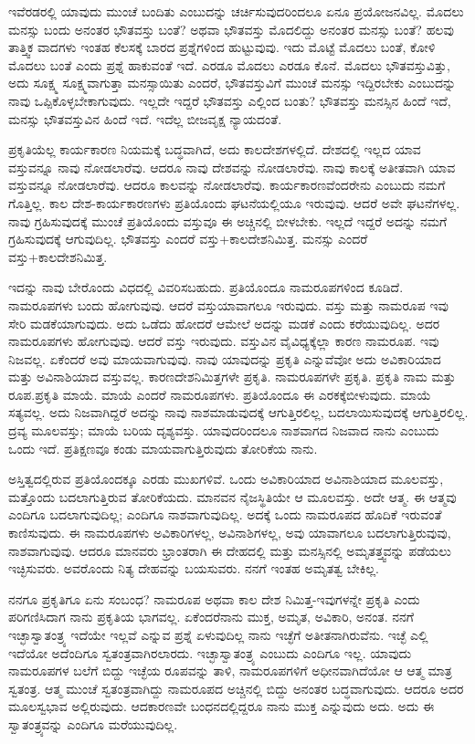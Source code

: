 ಇವೆರಡರಲ್ಲಿ ಯಾವುದು ಮುಂಚೆ ಬಂದಿತು ಎಂಬುದನ್ನು ಚರ್ಚಿಸುವುದರಿಂದಲೂ ಏನೂ ಪ್ರಯೋಜನವಿಲ್ಲ. ಮೊದಲು ಮನಸ್ಸು ಬಂದು ಅನಂತರ ಭೌತವಸ್ತು ಬಂತೆ? ಅಥವಾ ಭೌತವಸ್ತು ಮೊದಲಿದ್ದು ಅನಂತರ ಮನಸ್ಸು ಬಂತೆ? ಹಲವು ತಾತ್ತ್ವಿಕ ವಾದಗಳು ಇಂತಹ ಕೆಲಸಕ್ಕೆ ಬಾರದ ಪ್ರಶ್ನೆಗಳಿಂದ ಹುಟ್ಟುವುವು. ಇದು ಮೊಟ್ಟೆ ಮೊದಲು ಬಂತೆ, ಕೋಳಿ ಮೊದಲು ಬಂತೆ ಎಂದು ಪ್ರಶ್ನೆ ಹಾಕುವಂತೆ ಇದೆ. ಎರಡೂ ಮೊದಲು ಎರಡೂ ಕೊನೆ. ಮೊದಲು ಭೌತವಸ್ತುವಿತ್ತು, ಅದು ಸೂಕ್ಷ್ಮ ಸೂಕ್ಷ್ಮವಾಗುತ್ತಾ ಮನಸ್ಸಾಯಿತು ಎಂದರೆ, ಭೌತವಸ್ತುವಿಗೆ ಮುಂಚೆ ಮನಸ್ಸು ಇದ್ದಿರಬೇಕು ಎಂಬುದನ್ನು ನಾವು ಒಪ್ಪಿಕೊಳ್ಳಬೇಕಾಗುವುದು. ಇಲ್ಲದೇ ಇದ್ದರೆ ಭೌತವಸ್ತು ಎಲ್ಲಿಂದ ಬಂತು? ಭೌತವಸ್ತು ಮನಸ್ಸಿನ ಹಿಂದೆ ಇದೆ, ಮನಸ್ಸು ಭೌತವಸ್ತುವಿನ ಹಿಂದೆ ಇದೆ. ಇದೆಲ್ಲ ಬೀಜವೃಕ್ಷ ನ್ಯಾಯದಂತೆ.

ಪ್ರಕೃತಿಯೆಲ್ಲ ಕಾರ್ಯಕಾರಣ ನಿಯಮಕ್ಕೆ ಬದ್ಧವಾಗಿದೆ, ಅದು ಕಾಲದೇಶಗಳಲ್ಲಿದೆ. ದೇಶದಲ್ಲಿ ಇಲ್ಲದ ಯಾವ ವಸ್ತುವನ್ನೂ ನಾವು ನೋಡಲಾರೆವು. ಆದರೂ ನಾವು ದೇಶವನ್ನು ನೋಡಲಾರೆವು. ನಾವು ಕಾಲಕ್ಕೆ ಅತೀತವಾಗಿ ಯಾವ ವಸ್ತುವನ್ನೂ ನೋಡಲಾರೆವು. ಆದರೂ ಕಾಲವನ್ನು ನೋಡಲಾರೆವು. ಕಾರ್ಯಕಾರಣವೆಂದರೇನು ಎಂಬುದು ನಮಗೆ ಗೊತ್ತಿಲ್ಲ. ಕಾಲ ದೇಶ-ಕಾರ್ಯಕಾರಣಗಳು ಪ್ರತಿಯೊಂದು ಘಟನೆಯಲ್ಲಿಯೂ ಇರುವುವು. ಆದರೆ ಅವೇ ಘಟನೆಗಳಲ್ಲ. ನಾವು ಗ್ರಹಿಸುವುದಕ್ಕೆ ಮುಂಚೆ ಪ್ರತಿಯೊಂದು ವಸ್ತುವೂ ಈ ಅಚ್ಚಿನಲ್ಲಿ ಬೀಳಬೇಕು. ಇಲ್ಲದೆ ಇದ್ದರೆ ಅದನ್ನು ನಮಗೆ ಗ್ರಹಿಸುವುದಕ್ಕೆ ಆಗುವುದಿಲ್ಲ. ಭೌತವಸ್ತು ಎಂದರೆ ವಸ್ತು+ಕಾಲದೇಶನಿಮಿತ್ತ. ಮನಸ್ಸು ಎಂದರೆ ವಸ್ತು+ಕಾಲದೇಶನಿಮಿತ್ತ.

ಇದನ್ನು ನಾವು ಬೇರೊಂದು ವಿಧದಲ್ಲಿ ವಿವರಿಸಬಹುದು. ಪ್ರತಿಯೊಂದೂ ನಾಮರೂಪಗಳಿಂದ ಕೂಡಿದೆ. ನಾಮರೂಪಗಳು ಬಂದು ಹೋಗುವುವು. ಆದರೆ ವಸ್ತು\break ಯಾವಾಗಲೂ ಇರುವುದು. ವಸ್ತು ಮತ್ತು ನಾಮರೂಪ ಇವು ಸೇರಿ ಮಡಕೆಯಾಗುವುದು. ಅದು ಒಡೆದು ಹೋದರೆ ಆಮೇಲೆ ಅದನ್ನು ಮಡಕೆ ಎಂದು ಕರೆಯುವುದಿಲ್ಲ. ಅದರ ನಾಮರೂಪಗಳು ಹೋಗುವುವು. ಆದರೆ ವಸ್ತು ಇರುವುದು. ವಸ್ತುವಿನ ವೈವಿಧ್ಯಕ್ಕೆಲ್ಲಾ ಕಾರಣ ನಾಮರೂಪ. ಇವು ನಿಜವಲ್ಲ. ಏಕೆಂದರೆ ಅವು ಮಾಯವಾಗುವುವು. ನಾವು ಯಾವುದನ್ನು ಪ್ರಕೃತಿ ಎನ್ನುವೆವೋ ಅದು ಅವಿಕಾರಿಯಾದ ಮತ್ತು ಅವಿನಾಶಿಯಾದ ವಸ್ತುವಲ್ಲ. ಕಾರಣದೇಶನಿಮಿತ್ತಗಳೇ ಪ್ರಕೃತಿ. ನಾಮರೂಪಗಳೇ ಪ್ರಕೃತಿ. ಪ್ರಕೃತಿ ನಾಮ ಮತ್ತು ರೂಪ.\break ಪ್ರಕೃತಿ ಮಾಯೆ. ಮಾಯೆ ಎಂದರೆ ನಾಮರೂಪಗಳು. ಪ್ರತಿಯೊಂದೂ ಈ ಎರಕಕ್ಕೆ\break ಬೀಳುವುದು. ಮಾಯೆ ಸತ್ಯವಲ್ಲ. ಅದು ನಿಜವಾಗಿದ್ದರೆ ಅದನ್ನು ನಾವು ನಾಶಮಾಡುವುದಕ್ಕೆ ಆಗುತ್ತಿರಲಿಲ್ಲ, ಬದಲಾಯಿಸುವುದಕ್ಕೆ ಆಗುತ್ತಿರಲಿಲ್ಲ. ದ್ರವ್ಯ ಮೂಲವಸ್ತು; ಮಾಯೆ ಬರಿಯ ದೃಶ್ಯವಸ್ತು. ಯಾವುದರಿಂದಲೂ ನಾಶವಾಗದ ನಿಜವಾದ ನಾನು ಎಂಬುದು ಒಂದು ಇದೆ. ಪ್ರತಿಕ್ಷಣವೂ ಕಂಡು ಮಾಯವಾಗುತ್ತಿರುವುದು ತೋರಿಕೆಯ ನಾನು.

ಅಸ್ತಿತ್ವದಲ್ಲಿರುವ ಪ್ರತಿಯೊಂದಕ್ಕೂ ಎರಡು ಮುಖಗಳಿವೆ. ಒಂದು ಅವಿಕಾರಿಯಾದ ಅವಿನಾಶಿಯಾದ ಮೂಲವಸ್ತು, ಮತ್ತೊಂದು ಬದಲಾಗುತ್ತಿರುವ ತೋರಿಕೆಯದು. ಮಾನ\-ವನ ನೈಜಸ್ಥಿತಿಯೇ ಆ ಮೂಲವಸ್ತು. ಅದೇ ಆತ್ಮ. ಈ ಆತ್ಮವು ಎಂದಿಗೂ ಬದಲಾಗುವುದಿಲ್ಲ; ಎಂದಿಗೂ ನಾಶವಾಗುವುದಿಲ್ಲ. ಅದಕ್ಕೆ ಒಂದು ನಾಮರೂಪದ ಹೊದಿಕೆ ಇರುವಂತೆ ಕಾಣಿಸುವುದು. ಈ ನಾಮರೂಪಗಳು ಅವಿಕಾರಿಗಳಲ್ಲ, ಅವಿನಾಶಿಗಳಲ್ಲ, ಅವು ಯಾವಾಗಲೂ ಬದಲಾಗುತ್ತಿರುವುವು, ನಾಶವಾಗುವುವು. ಆದರೂ ಮಾನವರು ಭ್ರಾಂತರಾಗಿ ಈ ದೇಹದಲ್ಲಿ ಮತ್ತು ಮನಸ್ಸಿನಲ್ಲಿ ಅಮೃತತ್ತ್ವವನ್ನು ಪಡೆಯಲು ಇಚ್ಛಿಸುವರು. ಅವರೊಂದು ನಿತ್ಯ ದೇಹವನ್ನು ಬಯಸುವರು. ನನಗೆ ಇಂತಹ ಅಮೃತತ್ವ ಬೇಕಿಲ್ಲ.

ನನಗೂ ಪ್ರಕೃತಿಗೂ ಏನು ಸಂಬಂಧ? ನಾಮರೂಪ ಅಥವಾ ಕಾಲ ದೇಶ ನಿಮಿತ್ತ-ಇವುಗಳನ್ನೇ ಪ್ರಕೃತಿ ಎಂದು ಪರಿಗಣಿಸಿದಾಗ ನಾನು ಪ್ರಕೃತಿಯ ಭಾಗವಲ್ಲ. ಏಕೆಂದರೆ\break ನಾನು ಮುಕ್ತ, ಅಮೃತ, ಅವಿಕಾರಿ, ಅನಂತ. ನನಗೆ ಇಚ್ಛಾಸ್ವಾತಂತ್ರ್ಯ ಇದೆಯೇ ಇಲ್ಲವೆ ಎನ್ನುವ ಪ್ರಶ್ನೆ ಏಳುವುದಿಲ್ಲ ನಾನು ಇಚ್ಛೆಗೆ ಅತೀತನಾಗಿರುವೆನು. ಇಚ್ಛೆ ಎಲ್ಲಿ ಇದೆಯೋ ಅದೆಂದಿಗೂ ಸ್ವತಂತ್ರವಾಗಿರಲಾರದು. ಇಚ್ಛಾಸ್ವಾತಂತ್ರ್ಯ ಎಂಬುದು ಎಂದಿಗೂ ಇಲ್ಲ. ಯಾವುದು ನಾಮರೂಪಗಳ ಬಲೆಗೆ ಬಿದ್ದು ಇಚ್ಛೆಯ ರೂಪವನ್ನು ತಾಳಿ, ನಾಮರೂಪಗಳಿಗೆ ಅಧೀನವಾಗಿದೆಯೋ ಆ ಆತ್ಮ ಮಾತ್ರ ಸ್ವತಂತ್ರ. ಆತ್ಮ ಮುಂಚೆ ಸ್ವತಂತ್ರವಾಗಿದ್ದು ನಾಮರೂಪದ ಅಚ್ಚಿನಲ್ಲಿ ಬಿದ್ದು ಅನಂತರ ಬದ್ಧವಾಗುವುದು. ಆದರೂ ಅದರ ಮೂಲಸ್ವಭಾವ ಅಲ್ಲಿರುವುದು. ಆದಕಾರಣವೇ ಬಂಧನದಲ್ಲಿದ್ದರೂ ನಾನು ಮುಕ್ತ ಎನ್ನುವುದು ಅದು. ಅದು ಈ ಸ್ವಾತಂತ್ರ್ಯವನ್ನು ಎಂದಿಗೂ ಮರೆಯುವುದಿಲ್ಲ.

